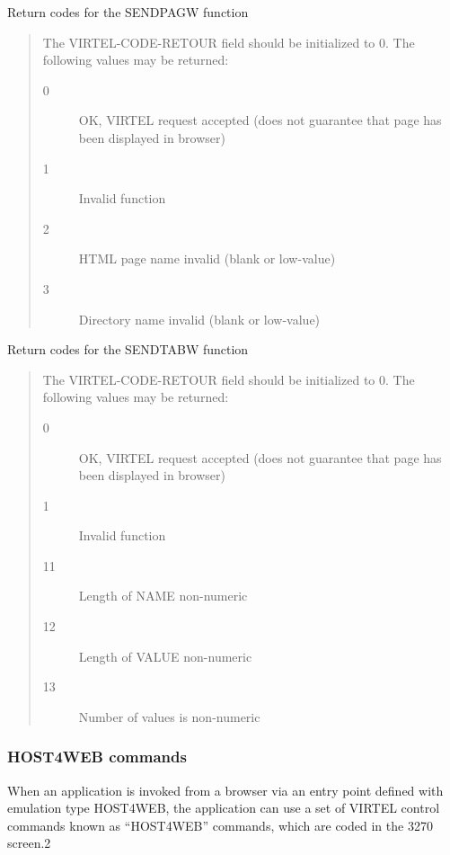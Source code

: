 \documentclass[letterpaper,10pt,english]{sphinxmanual}
\begin{document}
Return codes for the SENDPAGW function
\begin{quote}

The VIRTEL-CODE-RETOUR field should be initialized to 0. The following values may be returned:
\begin{description}
\item[{0}] \leavevmode
OK, VIRTEL request accepted (does not guarantee that page has been displayed in browser)

\item[{1}] \leavevmode
Invalid function

\item[{2}] \leavevmode
HTML page name invalid (blank or low-value)

\item[{3}] \leavevmode
Directory name invalid (blank or low-value)

\end{description}
\end{quote}

Return codes for the SENDTABW function
\begin{quote}

The VIRTEL-CODE-RETOUR field should be initialized to 0. The following values may be returned:
\begin{description}
\item[{0}] \leavevmode
OK, VIRTEL request accepted (does not guarantee that page has been displayed in browser)

\item[{1}] \leavevmode
Invalid function

\item[{11}] \leavevmode
Length of NAME non-numeric

\item[{12}] \leavevmode
Length of VALUE non-numeric

\item[{13}] \leavevmode
Number of values is non-numeric

\end{description}
\end{quote}


\subsubsection{HOST4WEB commands}
\label{\detokenize{User_Guide:v457ug-host4web}}\label{\detokenize{User_Guide:host4web-commands}}
When an application is invoked from a browser via an entry point defined with emulation type HOST4WEB, the
application can use a set of VIRTEL control commands known as “HOST4WEB” commands, which are coded in the 3270
screen.2
\end{document}
